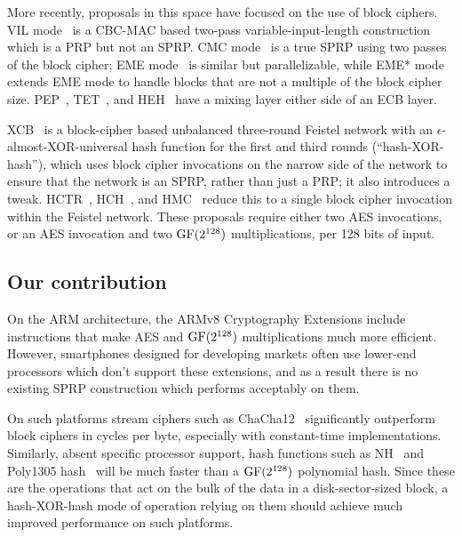 \documentclass[eprint.tex]{subfiles}
\begin{document}
More recently, proposals in this space have focused on the use of
block ciphers. VIL mode~\cite{brvil} is a CBC-MAC based two-pass variable-input-length construction which
is a PRP but not an SPRP. CMC mode~\cite{cmc} is a true SPRP using two passes of the block cipher;
EME mode~\cite{eme} is similar but parallelizable, while
EME* mode~\cite{emestar} extends EME mode to handle blocks that are not a multiple of the block
cipher size. PEP~\cite{pep}, TET~\cite{tet}, and HEH~\cite{heh} have a mixing layer either side of
an ECB layer.

XCB~\cite{xcb} is a block-cipher based unbalanced three-round Feistel network with an
$\epsilon$-almost-XOR-universal hash function for the first and third rounds
(``hash-XOR-hash''),
which uses block
cipher invocations on the narrow side of the network to ensure that the network is an SPRP, rather
than just a PRP; it also introduces a tweak.
HCTR~\cite{hctr,hctr2}, HCH~\cite{hch}, and HMC~\cite{hmc} reduce this to a single
block cipher invocation within the Feistel network.
These proposals require
either two AES invocations, or an AES invocation and two $\operatorname{GF}(2^{128})$ multiplications,
per 128 bits of input.

\subsection{Our contribution}
On the ARM architecture, the ARMv8 Cryptography Extensions include instructions that make
AES and $\operatorname{GF}(2^{128})$ multiplications much more efficient. However,
smartphones designed for developing markets
often use lower-end processors which
don't support these extensions, and as a result there is no existing SPRP construction which performs
acceptably on them.

On such platforms stream ciphers such as ChaCha12~\cite{chacha} significantly
outperform block ciphers in cycles per byte, especially with constant-time implementations.
Similarly, absent specific processor support, hash functions such as NH~\cite{umac2} and
Poly1305 hash~\cite{poly1305} will be much faster
than a $\operatorname{GF}(2^{128})$ polynomial hash. Since these are the operations that act on the bulk of
the data in a disk-sector-sized block, a hash-XOR-hash
mode of operation relying on them should achieve
much improved performance on such platforms.
\end{document}
